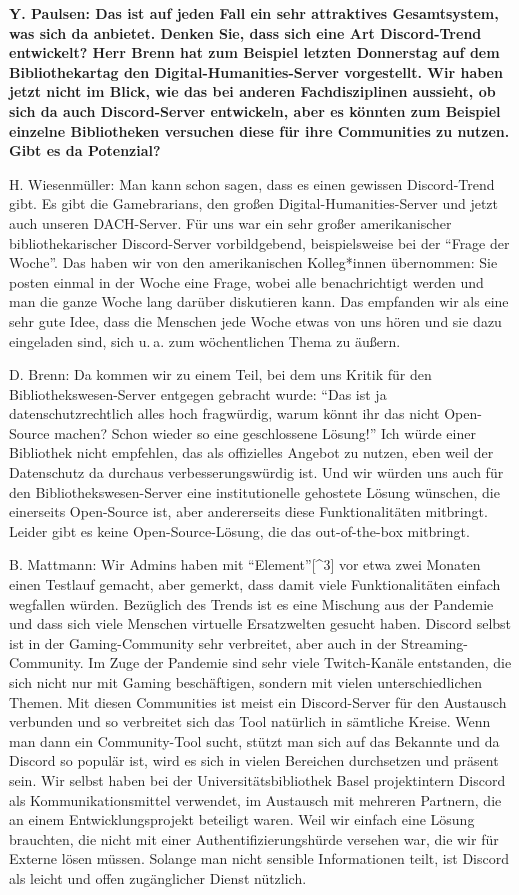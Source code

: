 \documentclass[a4paper,
fontsize=11pt,
oneside,
numbers=noperiodatend,
parskip=half-,
bibliography=totoc,
final
]{scrartcl}
\begin{document}
\textbf{Y. Paulsen: Das ist auf jeden Fall ein sehr attraktives
Gesamtsystem, was sich da anbietet. Denken Sie, dass sich eine Art
Discord-Trend entwickelt? Herr Brenn hat zum Beispiel letzten Donnerstag
auf dem Bibliothekartag den Digital-Humanities-Server vorgestellt. Wir
haben jetzt nicht im Blick, wie das bei anderen Fachdisziplinen
aussieht, ob sich da auch Discord-Server entwickeln, aber es könnten zum
Beispiel einzelne Bibliotheken versuchen diese für ihre Communities zu
nutzen. Gibt es da Potenzial?}

H. Wiesenmüller: Man kann schon sagen, dass es einen gewissen
Discord-Trend gibt. Es gibt die Gamebrarians, den großen
Digital-Humanities-Server und jetzt auch unseren DACH-Server. Für uns
war ein sehr großer amerikanischer bibliothekarischer Discord-Server
vorbildgebend, beispielsweise bei der \enquote{Frage der Woche}. Das
haben wir von den amerikanischen Kolleg*innen übernommen: Sie posten
einmal in der Woche eine Frage, wobei alle benachrichtigt werden und man
die ganze Woche lang darüber diskutieren kann. Das empfanden wir als
eine sehr gute Idee, dass die Menschen jede Woche etwas von uns hören
und sie dazu eingeladen sind, sich u. a. zum wöchentlichen Thema zu
äußern.

D. Brenn: Da kommen wir zu einem Teil, bei dem uns Kritik für den
Bibliothekswesen-Server entgegen gebracht wurde: \enquote{Das ist ja
datenschutzrechtlich alles hoch fragwürdig, warum könnt ihr das nicht
Open-Source machen? Schon wieder so eine geschlossene Lösung!} Ich würde
einer Bibliothek nicht empfehlen, das als offizielles Angebot zu nutzen,
eben weil der Datenschutz da durchaus verbesserungswürdig ist. Und wir
würden uns auch für den Bibliothekswesen-Server eine institutionelle
gehostete Lösung wünschen, die einerseits Open-Source ist, aber
andererseits diese Funktionalitäten mitbringt. Leider gibt es keine
Open-Source-Lösung, die das out-of-the-box mitbringt.

B. Mattmann: Wir Admins haben mit \enquote{Element}{[}\^{}3{]} vor etwa
zwei Monaten einen Testlauf gemacht, aber gemerkt, dass damit viele
Funktionalitäten einfach wegfallen würden. Bezüglich des Trends ist es
eine Mischung aus der Pandemie und dass sich viele Menschen virtuelle
Ersatzwelten gesucht haben. Discord selbst ist in der Gaming-Community
sehr verbreitet, aber auch in der Streaming-Community. Im Zuge der
Pandemie sind sehr viele Twitch-Kanäle entstanden, die sich nicht nur
mit Gaming beschäftigen, sondern mit vielen unterschiedlichen Themen.
Mit diesen Communities ist meist ein Discord-Server für den Austausch
verbunden und so verbreitet sich das Tool natürlich in sämtliche Kreise.
Wenn man dann ein Community-Tool sucht, stützt man sich auf das Bekannte
und da Discord so populär ist, wird es sich in vielen Bereichen
durchsetzen und präsent sein. Wir selbst haben bei der
Universitätsbibliothek Basel projektintern Discord als
Kommunikationsmittel verwendet, im Austausch mit mehreren Partnern, die
an einem Entwicklungsprojekt beteiligt waren. Weil wir einfach eine
Lösung brauchten, die nicht mit einer Authentifizierungshürde versehen
war, die wir für Externe lösen müssen. Solange man nicht sensible
Informationen teilt, ist Discord als leicht und offen zugänglicher
Dienst nützlich.
\end{document}
